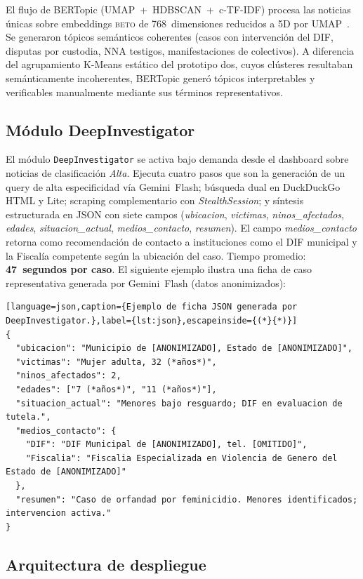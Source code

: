 \documentclass[conference]{IEEEtran}
\newcommand{\BETO}{\textsc{beto}}
\newcommand{\NNA}{NNA}
\begin{document}
El flujo de BERTopic (UMAP~+~HDBSCAN~+~c-TF-IDF) procesa las
noticias únicas sobre embeddings \BETO{} de 768~dimensiones
reducidos a 5D por UMAP~\cite{bertopic2022}. Se generaron tópicos
semánticos coherentes (casos con intervención del DIF, disputas por
custodia, \NNA{} testigos, manifestaciones de colectivos). A diferencia
del agrupamiento K-Means estático del prototipo dos, cuyos clústeres
resultaban semánticamente incoherentes, BERTopic generó tópicos
interpretables y verificables manualmente mediante sus términos
representativos.

\subsection{Módulo DeepInvestigator} 

El módulo \texttt{DeepInvestigator} se activa bajo demanda desde el
dashboard sobre noticias de clasificación \textit{Alta}. Ejecuta cuatro
pasos que son la generación de un query de alta especificidad vía Gemini~Flash;
búsqueda dual en DuckDuckGo HTML y Lite; scraping complementario
con \textit{StealthSession}; y síntesis estructurada en JSON con
siete campos (\textit{ubicacion}, \textit{victimas},
\textit{ninos\_afectados}, \textit{edades}, \textit{situacion\_actual},
\textit{medios\_contacto}, \textit{resumen}). El campo
\textit{medios\_contacto} retorna como recomendación de contacto a instituciones
como el DIF municipal y la Fiscalía
competente según la ubicación del caso. Tiempo promedio:
\textbf{47~segundos por caso}.
El siguiente ejemplo ilustra una ficha de caso representativa generada
por Gemini~Flash (datos anonimizados):

\begin{lstlisting}[language=json,caption={Ejemplo de ficha JSON generada por DeepInvestigator.},label={lst:json},escapeinside={(*}{*)}]
{
  "ubicacion": "Municipio de [ANONIMIZADO], Estado de [ANONIMIZADO]",
  "victimas": "Mujer adulta, 32 (*años*)",
  "ninos_afectados": 2,
  "edades": ["7 (*años*)", "11 (*años*)"],
  "situacion_actual": "Menores bajo resguardo; DIF en evaluacion de tutela.",
  "medios_contacto": {
    "DIF": "DIF Municipal de [ANONIMIZADO], tel. [OMITIDO]",
    "Fiscalia": "Fiscalia Especializada en Violencia de Genero del Estado de [ANONIMIZADO]"
  },
  "resumen": "Caso de orfandad por feminicidio. Menores identificados; intervencion activa."
}
\end{lstlisting}

\subsection{Arquitectura de despliegue}
\end{document}
